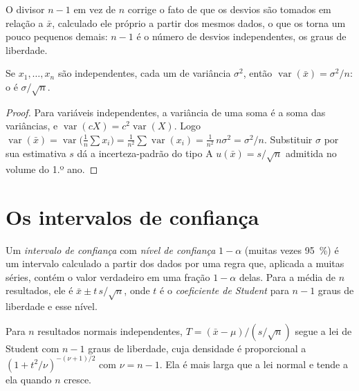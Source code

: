 O divisor $n - 1$ em vez de $n$ corrige o fato de que os desvios são tomados em relação a $\bar x$,
calculado ele próprio a partir dos mesmos dados, o que os torna um pouco pequenos demais: $n - 1$ é o
número de desvios independentes, os graus de liberdade.

\begin{theorem}\label{thm:b2:measurement-statistics:mean-variance}
Se $x_1, \dots, x_n$ são independentes, cada um de variância $\sigma^2$, então $\operatorname{var}(\bar x) =
\sigma^2/n$: o  é $\sigma/\sqrt n$.
\end{theorem}

\begin{proof}
Para variáveis independentes, a variância de uma soma é a soma das variâncias, e
$\operatorname{var}(cX) = c^2\operatorname{var}(X)$. Logo $\operatorname{var}(\bar x) =
\operatorname{var}\bigl(\tfrac1n\sum x_i\bigr) = \tfrac{1}{n^2}\sum\operatorname{var}(x_i) =
\tfrac{1}{n^2}\,n\sigma^2 = \sigma^2/n$. Substituir $\sigma$ por sua estimativa $s$ dá a incerteza-padrão
do tipo A $u(\bar x) = s/\sqrt n$ admitida no volume do 1.º ano.
\end{proof}

\section{Os intervalos de confiança}

\begin{definition}\label{def:b2:measurement-statistics:confidence}
Um \emph{intervalo de confiança} com \emph{nível de confiança}
$1 - \alpha$ (muitas vezes 95~\%) é um intervalo calculado a partir dos dados por uma regra que,
aplicada a muitas séries, contém o valor verdadeiro em uma fração $1 - \alpha$ delas. Para a média de
$n$ resultados, ele é $\bar x \pm t\,s/\sqrt n$, onde $t$ é o \emph{coeficiente de Student}
para $n - 1$ graus de liberdade e esse nível.
\end{definition}

\begin{proposition}\label{prop:b2:measurement-statistics:student}
Para $n$ resultados normais independentes, $T = (\bar x - \mu)/(s/\sqrt n)$ segue a lei de Student com
$n - 1$ graus de liberdade, cuja densidade é proporcional a $(1 + t^2/\nu)^{-(\nu+1)/2}$ com
$\nu = n - 1$. Ela é mais larga que a lei normal e tende a ela quando $n$ cresce.
\end{proposition}

